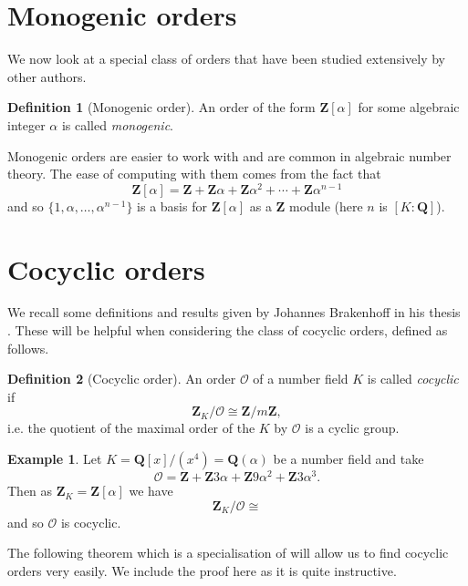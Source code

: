 \documentclass[a4paper,abstracton,bibtotoc]{scrreprt}
\theoremstyle{definition}
\newtheorem{defn}{Definition}
\newtheorem{ex}{Example}
\newcommand{\QQ}{\mathbf{Q}}
\newcommand{\ZZ}{\mathbf{Z}}
\renewcommand{\O}{\mathcal{O}}
\begin{document}

\section{Monogenic orders}

We now look at a special class of orders that have been studied extensively by other authors.

\begin{defn}[Monogenic order]
An order of the form $\ZZ[\alpha]$ for some algebraic integer $\alpha$ is called \emph{monogenic}.
\end{defn}

Monogenic orders are easier to work with and are common in algebraic number theory.
The ease of computing with them comes from the fact that
\[
\ZZ[\alpha] = \ZZ + \ZZ\alpha + \ZZ\alpha^2 + \cdots + \ZZ\alpha^{n-1}
\]
and so $\{1,\alpha,\ldots,\alpha^{n-1}\}$ is a basis for $\ZZ[\alpha]$ as a $\ZZ$ module (here $n$ is $[K : \QQ]$).




\section{Cocyclic orders}
\label{sec:cocyc}
We recall some definitions and results given by Johannes Brakenhoff in his thesis \cite{brakenhoff}.
These will be helpful when considering the class of cocyclic orders, defined as follows.

\begin{defn}[Cocyclic order]
An order $\O$ of a number field $K$ is called \emph{cocyclic} if
\[
\ZZ_K/\O \cong \ZZ/m\ZZ,
\]
i.e. the quotient of the maximal order of the $K$ by $\O$ is a cyclic group.
\end{defn}

\begin{ex}
\label{ex:cocyc}
Let $K = \QQ[x]/(x^4 ) = \QQ(\alpha)$ be a number field and take %
\[
\O = \ZZ + \ZZ3\alpha + \ZZ9\alpha^2 + \ZZ3\alpha^3.
\]
Then as $\ZZ_K = \ZZ[\alpha]$ we have
\[
\ZZ_K/\O \cong 
\]
and so $\O$ is cocyclic.
\end{ex}

The following theorem which is a specialisation of \cite[Thm. 4.1]{brakenhoff} will allow us to find cocyclic orders very easily.
We include the proof here as it is quite instructive. %
\end{document}
